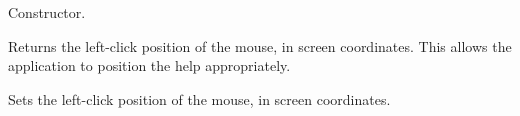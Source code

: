 

Constructor.

\label{wxhelpeventgetposition}


Returns the left-click position of the mouse, in screen coordinates. This allows
the application to position the help appropriately.

\label{wxhelpeventsetposition}


Sets the left-click position of the mouse, in screen coordinates.

